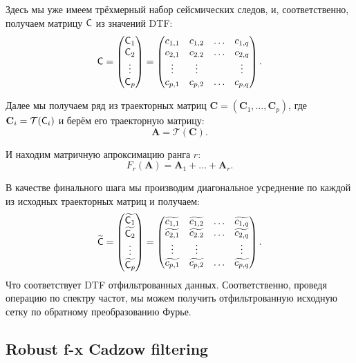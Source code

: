 \documentclass[specialist,
               substylefile = spbu.rtx,
               subf,href,colorlinks=true, 12pt]{disser}
\begin{document}
Здесь мы уже имеем трёхмерный набор сейсмических следов, и, соответственно, получаем матрицу $\textsf{C}$ из значений DTF:
$$\textsf{C} = 
\begin{pmatrix}
           \textsf{C}_1 \\
           \textsf{C}_2\\
           \vdots\\
           \textsf{C}_p
         \end{pmatrix}
= \begin{pmatrix}
           c_{1,1} & c_{1,2} & \ldots & c_{1,q}\\
           c_{2,1} & c_{2.2} & \ldots & c_{2,q}\\
           \vdots & \vdots & & \vdots\\
           c_{p,1} & c_{p,2} & \ldots & c_{p,q}
         \end{pmatrix}.$$

Далее мы получаем ряд из траекторных матриц $\mathbf{C} = (\mathbf{C}_1, \ldots, \mathbf{C}_p)$, где $\mathbf{C}_i = \mathcal{T}(\textsf{C}_i)$ и берём его траекторную матрицу:
$$\mathbf{A} = \mathcal{T}(\mathbf{C}).$$

И находим матричную апроксимацию ранга $r$:
$$F_r(\mathbf{A}) = \mathbf{A}_1 + \ldots + \mathbf{A}_r.$$

В качестве финального шага мы производим диагональное усреднение по каждой из исходных траекторных матриц и получаем:
$$\widetilde{\textsf{C}} = 
\begin{pmatrix}
           \widetilde{\textsf{C}_1} \\
           \widetilde{\textsf{C}_2}\\
           \vdots\\
           \widetilde{\textsf{C}_p}
         \end{pmatrix}
= \begin{pmatrix}
           \widetilde{c_{1,1}} & \widetilde{c_{1,2}} & \ldots & \widetilde{c_{1,q}}\\
           \widetilde{c_{2,1}} & \widetilde{c_{2.2}} & \ldots & \widetilde{c_{2,q}}\\
           \vdots & \vdots & & \vdots\\
           \widetilde{c_{p,1}} & \widetilde{c_{p,2}} & \ldots & \widetilde{c_{p,q}}
         \end{pmatrix}.$$
Что соответствует DTF отфильтрованных данных. Соответственно, проведя операцию по спектру частот, мы можем получить отфильтрованную исходную сетку по обратному преобразованию Фурье.

\subsection{Robust f-x Cadzow filtering}
\end{document}
